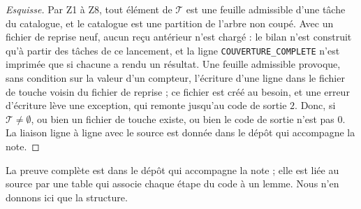 \documentclass[11pt,a4paper]{amsart}
\theoremstyle{plain}
\theoremstyle{definition}
\numberwithin{equation}{section}
\newcommand{\Tc}{\mathcal{T}}
\begin{document}
\begin{proof}[Esquisse]
Par Z1 à Z8, tout élément de $\Tc$ est une feuille admissible d'une tâche du catalogue, et le catalogue est une partition de l'arbre non coupé. Avec un fichier de reprise neuf, aucun reçu antérieur n'est chargé : le bilan n'est construit qu'à partir des tâches de ce lancement, et la ligne \texttt{COUVERTURE\_COMPLETE} n'est imprimée que si chacune a rendu un résultat. Une feuille admissible provoque, sans condition sur la valeur d'un compteur, l'écriture d'une ligne dans le fichier de touche voisin du fichier de reprise ; ce fichier est créé au besoin, et une erreur d'écriture lève une exception, qui remonte jusqu'au code de sortie $2$. Donc, si $\Tc\ne\emptyset$, ou bien un fichier de touche existe, ou bien le code de sortie n'est pas $0$. La liaison ligne à ligne avec le source est donnée dans le dépôt qui accompagne la note.
\end{proof}

La preuve complète est dans le dépôt qui accompagne la note ; elle est liée au source par une table qui associe chaque étape du code à un lemme. Nous n'en donnons ici que la structure.
\end{document}
